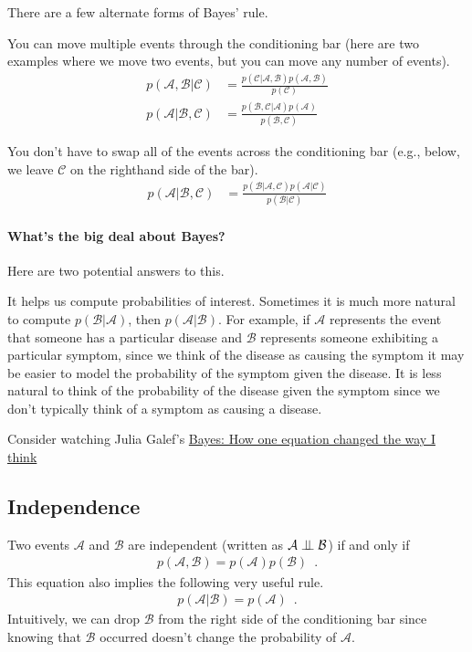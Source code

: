 \documentclass{tufte-handout}
\begin{document}
There are a few alternate forms of Bayes' rule.
\bi
\item You can move multiple events through the conditioning bar (here are two examples where we move two events, but you can move any number of events).
\begin{align}
p(\mathcal{A}, \mathcal{B} | \mathcal{C}) &= \frac{p(\mathcal{C}|\mathcal{A}, \mathcal{B}) p(\mathcal{A}, \mathcal{B})}{p(\mathcal{C})} \\
p(\mathcal{A} |  \mathcal{B}, \mathcal{C}) &= \frac{p(\mathcal{B}, \mathcal{C}|\mathcal{A}) p(\mathcal{A})}{p(\mathcal{B}, \mathcal{C})}
\end{align}
\item You don't have to swap all of the events across the conditioning bar (e.g., below, we leave $\mathcal{C}$ on the righthand side of the bar).
\begin{align}
p(\mathcal{A}|\mathcal{B},\mathcal{C}) &= \frac{p(\mathcal{B} | \mathcal{A}, \mathcal{C}) p(\mathcal{A}|\mathcal{C})}{p(\mathcal{B}|\mathcal{C})}
\end{align}
\ei


\paragraph{What's the big deal about Bayes?}
Here are two potential answers to this.
\bi
\item It helps us compute probabilities of interest.  Sometimes it is much more natural to compute $p(\mathcal{B} | \mathcal{A})$, then $p(\mathcal{A} | \mathcal{B})$.  For example, if $\mathcal{A}$ represents the event that someone has a particular disease and $\mathcal{B}$ represents someone exhibiting a particular symptom, since we think of the disease as causing the symptom it may be easier to model the probability of the symptom given the disease.  It is less natural to think of the probability of the disease given the symptom since we don't typically think of a symptom as causing a disease.
\item Consider watching Julia Galef's \href{https://www.youtube.com/watch?v=za7RqnT7CM0}{Bayes: How one equation changed the way I think}
\ei


\subsection{Independence}

Two events $\mathcal{A}$ and $\mathcal{B}$ are independent (written as $\mathcal{A} \perp\!\!\!\perp \mathcal{B}$) if and only if
\begin{align}
p(\mathcal{A}, \mathcal{B}) = p(\mathcal{A}) p(\mathcal{B}) \enspace .
\end{align}
This equation also implies the following very useful rule.
\begin{align}
p(\mathcal{A} | \mathcal{B}) = p(\mathcal{A}) \enspace .
\end{align}
Intuitively, we can drop $\mathcal{B}$ from the right side of the conditioning bar since knowing that $\mathcal{B}$ occurred doesn't change the probability of $\mathcal{A}$.
\end{document}
